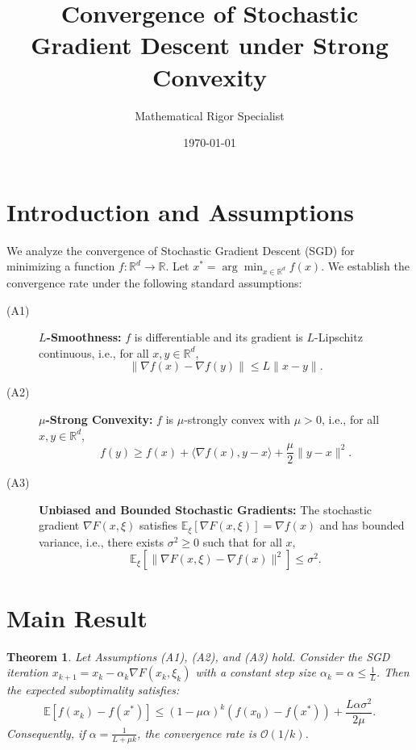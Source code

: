 \documentclass[11pt]{article}
\newtheorem{theorem}{Theorem}
\begin{document}
\title{Convergence of Stochastic Gradient Descent under Strong Convexity}
\author{Mathematical Rigor Specialist}
\date{\today}
\maketitle

\section{Introduction and Assumptions}

We analyze the convergence of Stochastic Gradient Descent (SGD) for minimizing a function $f: \mathbb{R}^d \to \mathbb{R}$. Let $x^* = \arg\min_{x \in \mathbb{R}^d} f(x)$. We establish the convergence rate under the following standard assumptions:

\begin{description}
    \item[(A1)] \textbf{$L$-Smoothness:} $f$ is differentiable and its gradient is $L$-Lipschitz continuous, i.e., for all $x, y \in \mathbb{R}^d$,
    \[ \|\nabla f(x) - \nabla f(y)\| \le L \|x - y\|. \]
    \item[(A2)] \textbf{$\mu$-Strong Convexity:} $f$ is $\mu$-strongly convex with $\mu > 0$, i.e., for all $x, y \in \mathbb{R}^d$,
    \[ f(y) \ge f(x) + \langle \nabla f(x), y - x \rangle + \frac{\mu}{2} \|y - x\|^2. \]
    \item[(A3)] \textbf{Unbiased and Bounded Stochastic Gradients:} The stochastic gradient $\nabla F(x, \xi)$ satisfies $\mathbb{E}_\xi[\nabla F(x, \xi)] = \nabla f(x)$ and has bounded variance, i.e., there exists $\sigma^2 \ge 0$ such that for all $x$,
    \[ \mathbb{E}_\xi[\|\nabla F(x, \xi) - \nabla f(x)\|^2] \le \sigma^2. \]
\end{description}

\section{Main Result}

\begin{theorem}
    Let Assumptions (A1), (A2), and (A3) hold. Consider the SGD iteration $x_{k+1} = x_k - \alpha_k \nabla F(x_k, \xi_k)$ with a constant step size $\alpha_k = \alpha \le \frac{1}{L}$. Then the expected suboptimality satisfies:
    \[ \mathbb{E}[f(x_k) - f(x^*)] \le \left(1 - \mu \alpha\right)^k (f(x_0) - f(x^*)) + \frac{L \alpha \sigma^2}{2 \mu}. \]
    Consequently, if $\alpha = \frac{1}{L + \mu k}$, the convergence rate is $\mathcal{O}(1/k)$.
\end{theorem}
\end{document}
